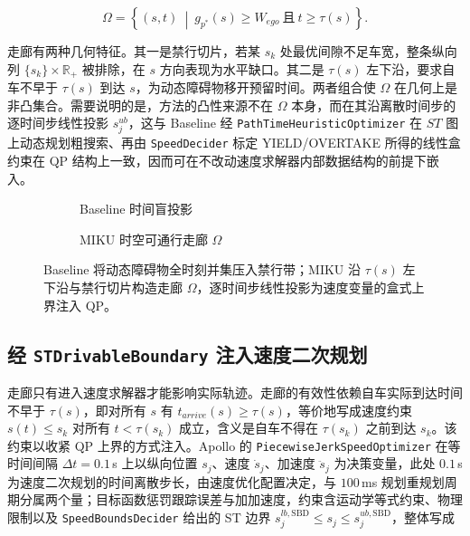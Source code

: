 \documentclass[a4paper,11pt]{ctexart}
\theoremstyle{definition}
\begin{document}
\begin{equation}
    \Omega = \left\{ (s,t) \ \middle|\ g_{p^{*}}(s) \geq W_{ego}\ \text{且}\ t \geq \tau(s) \right\}.
    \label{eq:st_corridor}
\end{equation}

走廊有两种几何特征。其一是禁行切片，若某 $s_k$ 处最优间隙不足车宽，整条纵向列 $\{s_k\}\times\mathbb{R}_{+}$ 被排除，在 $s$ 方向表现为水平缺口。其二是 $\tau(s)$ 左下沿，要求自车不早于 $\tau(s)$ 到达 $s$，为动态障碍物移开预留时间。两者组合使 $\Omega$ 在几何上是非凸集合。需要说明的是，方法的凸性来源不在 $\Omega$ 本身，而在其沿离散时间步的逐时间步线性投影 $s_j^{ub}$，这与 Baseline 经 \texttt{PathTimeHeuristicOptimizer} 在 $ST$ 图上动态规划粗搜索、再由 \texttt{SpeedDecider} 标定 YIELD/OVERTAKE 所得的线性盒约束在 QP 结构上一致，因而可在不改动速度求解器内部数据结构的前提下嵌入。

\begin{figure}[htbp]
\centering
\begin{subfigure}[b]{0.46\textwidth}
  \centering
  \caption{Baseline 时间盲投影}
\end{subfigure}\hfill
\begin{subfigure}[b]{0.46\textwidth}
  \centering
  \caption{MIKU 时空可通行走廊 $\Omega$}
\end{subfigure}
\caption{ST 平面上的时空可通行走廊与上界收紧}
\caption*{Baseline 将动态障碍物全时刻并集压入禁行带；MIKU 沿 $\tau(s)$ 左下沿与禁行切片构造走廊 $\Omega$，逐时间步线性投影为速度变量的盒式上界注入 QP。}
\label{fig:corridor}
\end{figure}

\subsection{经 \texttt{STDrivableBoundary} 注入速度二次规划}
\label{sec:method_inject}

走廊只有进入速度求解器才能影响实际轨迹。走廊的有效性依赖自车实际到达时间不早于 $\tau(s)$，即对所有 $s$ 有 $t_{arrive}(s)\geq\tau(s)$，等价地写成速度约束 $s(t)\leq s_k$ 对所有 $t<\tau(s_k)$ 成立，含义是自车不得在 $\tau(s_k)$ 之前到达 $s_k$。该约束以收紧 QP 上界的方式注入。Apollo 的 \texttt{PiecewiseJerkSpeedOptimizer} 在等时间间隔 $\Delta t = 0.1$\,s 上以纵向位置 $s_j$、速度 $\dot{s}_j$、加速度 $\ddot{s}_j$ 为决策变量，此处 $0.1$\,s 为速度二次规划的时间离散步长，由速度优化配置决定，与 $100$\,ms 规划重规划周期分属两个量；目标函数惩罚跟踪误差与加加速度，约束含运动学等式约束、物理限制以及 \texttt{SpeedBoundsDecider} 给出的 ST 边界 $s_j^{lb,\mathrm{SBD}} \leq s_j \leq s_j^{ub,\mathrm{SBD}}$，整体写成
\end{document}
